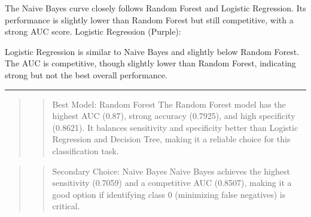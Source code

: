\documentclass[
]{article}
\begin{document}
The Naive Bayes curve closely follows Random Forest and Logistic
Regression. Its performance is slightly lower than Random Forest but
still competitive, with a strong AUC score. Logistic Regression
(Purple):

Logistic Regression is similar to Naive Bayes and slightly below Random
Forest. The AUC is competitive, though slightly lower than Random
Forest, indicating strong but not the best overall performance.

\begin{center}\rule{0.5\linewidth}{0.5pt}\end{center}

\begin{quote}
\begin{quote}
Best Model: Random Forest The Random Forest model has the highest AUC
(0.87), strong accuracy (0.7925), and high specificity (0.8621). It
balances sensitivity and specificity better than Logistic Regression and
Decision Tree, making it a reliable choice for this classification task.
\end{quote}
\end{quote}

\begin{quote}
\begin{quote}
Secondary Choice: Naive Bayes Naive Bayes achieves the highest
sensitivity (0.7059) and a competitive AUC (0.8507), making it a good
option if identifying class 0 (minimizing false negatives) is critical.
\end{quote}
\end{quote}
\end{document}
